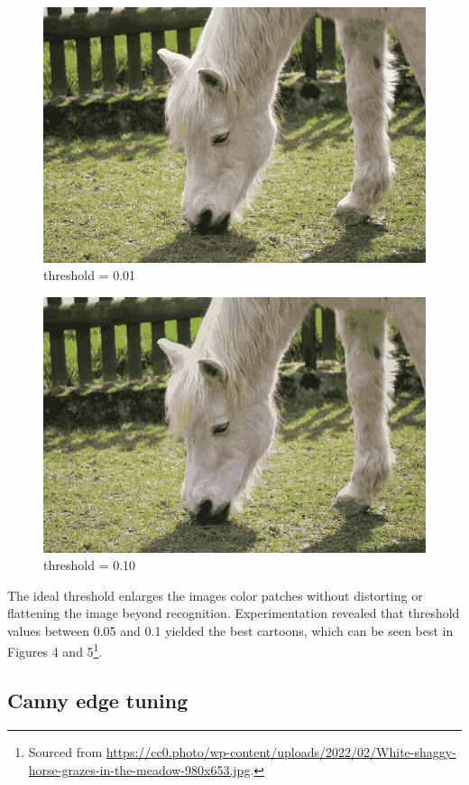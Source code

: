\documentclass[11pt]{article}
\begin{document}
\begin{figure}
  \includegraphics[width=\linewidth]{figures/white_horse_thresh=0.01.jpg}
  \caption{threshold = 0.01}
\end{figure}
\begin{figure}
  \includegraphics[width=\linewidth]{figures/white_horse_thresh=0.10.jpg}
  \caption{threshold = 0.10}
\end{figure}

The ideal threshold enlarges the images color patches without distorting or flattening the image beyond recognition.
Experimentation revealed that threshold values between 0.05 and 0.1 yielded the best cartoons,
which can be seen best in Figures 4 and 5\footnote{Sourced from \url{https://cc0.photo/wp-content/uploads/2022/02/White-shaggy-horse-grazes-in-the-meadow-980x653.jpg}.}.

\subsection{Canny edge tuning}
\end{document}

